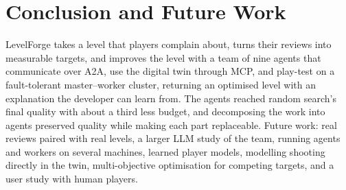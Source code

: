 \documentclass[conference]{IEEEtran}
\begin{document}
\section{Conclusion and Future Work}
LevelForge takes a level that players complain about, turns their reviews into measurable targets,
and improves the level with a team of nine agents that communicate over A2A, use the digital twin
through MCP, and play-test on a fault-tolerant master--worker cluster, returning an optimised level
with an explanation the developer can learn from. The agents reached random search's final quality
with about a third less budget, and decomposing the work into agents preserved quality while making
each part replaceable. Future work: real reviews paired with real levels, a larger LLM study of the
team, running agents and workers on several machines, learned player models, modelling shooting
directly in the twin, multi-objective optimisation for competing targets, and a user study with
human players.



\end{document}
